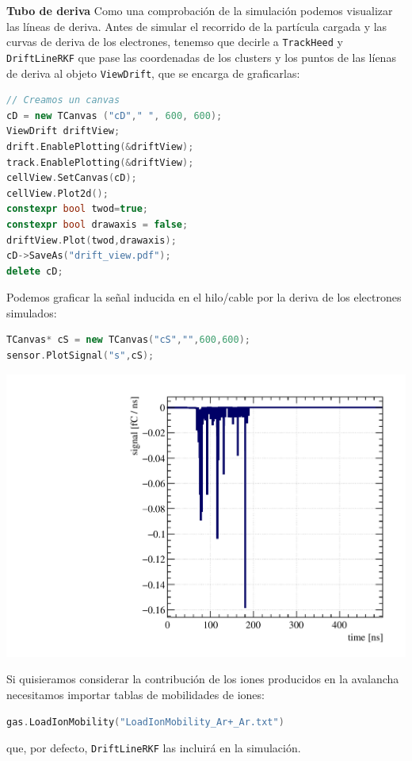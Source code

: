 \begin{Ejemplo}{\textbf{Tubo de deriva}}
Como una comprobación de la simulación podemos visualizar las líneas de deriva. Antes de simular el recorrido de la partícula cargada y las curvas de deriva de los electrones, tenemso que decirle a \texttt{TrackHeed} y \texttt{DriftLineRKF} que pase las coordenadas de los clusters y los puntos de las líenas de deriva al objeto \texttt{ViewDrift}, que se encarga de graficarlas:  \\

\begin{lstlisting}[language=C++,style=c++]
// Creamos un canvas
cD = new TCanvas ("cD"," ", 600, 600);
ViewDrift driftView;
drift.EnablePlotting(&driftView);
track.EnablePlotting(&driftView);
cellView.SetCanvas(cD);
cellView.Plot2d();
constexpr bool twod=true;
constexpr bool drawaxis = false;
driftView.Plot(twod,drawaxis);
cD->SaveAs("drift_view.pdf");
delete cD;
\end{lstlisting} 
\vspace*{1em}
Podemos graficar la señal inducida en el hilo/cable por la deriva de los electrones simulados:  \\

\begin{lstlisting}[language=C++,style=c++]
TCanvas* cS = new TCanvas("cS","",600,600);
sensor.PlotSignal("s",cS);
\end{lstlisting} 
\vspace*{1em}

\begin{center}
    \includegraphics[width=0.6\linewidth]{Chapters/EjemploGarfield/TuboDeriva/build/signal.pdf}
\end{center}

Si quisieramos considerar la contribución de los iones producidos en la avalancha necesitamos importar tablas de mobilidades de iones: \\


\begin{lstlisting}[language=C++,style=c++]
gas.LoadIonMobility("LoadIonMobility_Ar+_Ar.txt")
\end{lstlisting} 
\vspace*{1em}

que, por defecto, \texttt{DriftLineRKF} las incluirá en la simulación. 






\end{Ejemplo}